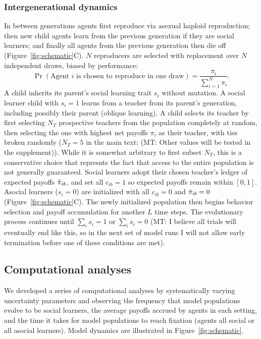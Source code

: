 \documentclass[letterpaper,11.5pt]{scrartcl}
\newcommand{\mt}[1]{{\textcolor{myorange} {({\tiny MT:} #1)}}}
\begin{document}
\subsubsection{Intergenerational dynamics}

In between generations agents first reproduce via asexual haploid reproduction; 
then new child agents learn from the
previous generation if they are social learners; and finally all agents from the
previous generation then die off (Figure~\ref{fig:schematic}C). 
$N$ reproducers are selected with replacement over $N$ independent draws, 
biased by performance:
\begin{equation}
  \Pr(\text{Agent $i$ is chosen to reproduce in one draw}) = \frac{\pi_i}{\sum_{i=1}^N \pi_i}.
\end{equation}
\noindent
A child inherits its parent's social learning trait $s_i$ without mutation.
A social learner child with $s_i = 1$ learns from a teacher from its parent's
generation, including possibly their parent (oblique learning). 
A child selects its teacher by first selecting $N_T$ prospective
teachers from the population completely at random, then selecting the one with
highest net payoffs $\pi_i$ as their teacher, with ties broken randomly ($N_T =
5$ in the main text; \mt{Other values will be tested in the supplement}). While it
is somewhat arbitrary to first subset $N_T$, this is a conservative choice that
represnts the fact that access to the entire population is not generally guaranteed.
Social learners adopt their chosen teacher's ledger of expected payoffs $\bar\pi_{ib}$,
and set all $c_{ib} = 1$ so expected payoffs remain within $[0, 1]$.  Asocial
learners ($s_i = 0$) are initialized with all $c_{ib} = 0$ and $\bar\pi_{ib} = 0$ 
(Figure~\ref{fig:schematic}C). The
newly initialized population then begins behavior selection and payoff accumulation
for another $L$ time steps. The evolutionary process continues until $\sum_i s_i
= 1$ or $\sum_i s_i = 0$ \mt{I believe all trials will eventually end like this, so
in the next set of model runs I will not allow early termination before one of these
conditions are met}.


\subsection{Computational analyses}

We developed a series of computational
analyses by systematically varying uncertainty parameters and observing the
frequency that model populations evolve to be social learners, the average payoffs
accrued by agents in each setting, and the time it takes for model populations to
reach fixation (agents all social or all asocial learners). Model dynamics are
illustrated in Figure~\ref{fig:schematic}. 
\end{document}
